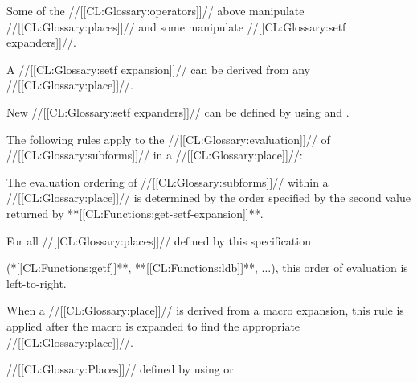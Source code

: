 Some of the //[[CL:Glossary:operators]]// above manipulate //[[CL:Glossary:places]]//
and some manipulate //[[CL:Glossary:setf expanders]]//.

A //[[CL:Glossary:setf expansion]]// can be derived from any //[[CL:Glossary:place]]//.


New //[[CL:Glossary:setf expanders]]// can be defined by using  
and .












































The following rules apply to the //[[CL:Glossary:evaluation]]// of //[[CL:Glossary:subforms]]// in a
//[[CL:Glossary:place]]//:

\beginlist
{}
The evaluation ordering of //[[CL:Glossary:subforms]]// within a //[[CL:Glossary:place]]//
is determined by the order specified by the second value returned by
**[[CL:Functions:get-setf-expansion]]**. 

For all //[[CL:Glossary:places]]// defined by this specification

(\eg **[[CL:Functions:getf]]**, **[[CL:Functions:ldb]]**, $\ldots$),
this order of evaluation is left-to-right.
%


When a //[[CL:Glossary:place]]// is derived from a macro expansion,
this rule is applied after the macro is expanded to find the appropriate //[[CL:Glossary:place]]//. 

//[[CL:Glossary:Places]]// defined by using  or

